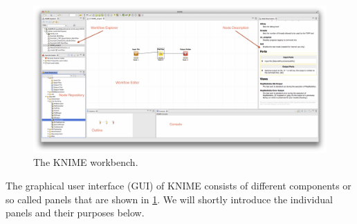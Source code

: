 \begin{figure}
\includegraphics[width=\textwidth]{graphics/knime_setup/knime_workbench_marked}
\caption{The KNIME workbench.}
\label{fig:knime_workbench}
\end{figure}

The graphical user interface (GUI) of KNIME consists of different components or so called panels that are shown in \cref{fig:knime_workbench}.
We will shortly introduce the individual panels and their purposes below.


